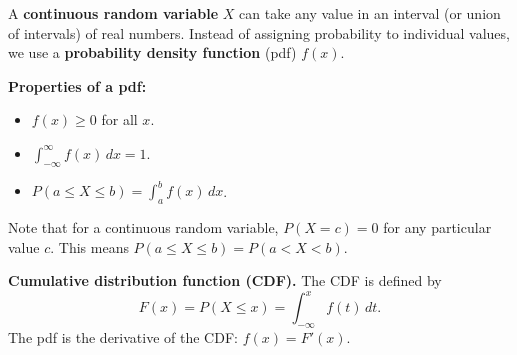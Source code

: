
A \textbf{continuous random variable} $X$ can take any value in an interval (or union of intervals) of real numbers. Instead of assigning probability to individual values, we use a \textbf{probability density function} (pdf) $f(x)$.

\textbf{Properties of a pdf:}
\begin{itemize}[leftmargin=*]
  \item $f(x) \geq 0$ for all $x$.
  \item $\displaystyle\int_{-\infty}^{\infty} f(x)\,dx = 1$.
  \item $P(a \leq X \leq b) = \displaystyle\int_a^b f(x)\,dx$.
\end{itemize}

Note that for a continuous random variable, $P(X = c) = 0$ for any particular value $c$. This means $P(a \leq X \leq b) = P(a < X < b)$.

\textbf{Cumulative distribution function (CDF).} The CDF is defined by
\[
F(x) = P(X \leq x) = \int_{-\infty}^{x} f(t)\,dt.
\]
The pdf is the derivative of the CDF: $f(x) = F'(x)$.


